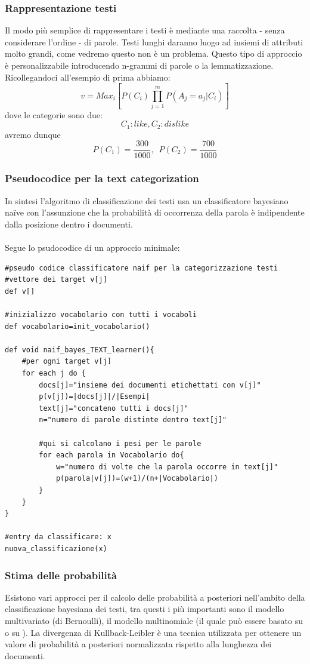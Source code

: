 \documentclass{article}
\theoremstyle{plain}
\theoremstyle{definition}
\begin{document}
\subsubsection{Rappresentazione testi}
Il modo più semplice di rappresentare i testi è mediante una raccolta - senza considerare l'ordine - di parole. Testi lunghi daranno luogo ad insiemi di attributi molto grandi, come vedremo questo non è un problema. Questo tipo di approccio è personalizzabile introducendo n-grammi di parole o la lemmatizzazione.
Ricollegandoci all'esempio di prima abbiamo: 
$$v=Max_i [P(C_i)\prod_{j=1}^m P(A_j=a_j|C_i)]$$
dove le categorie sono due: $$C_1:like, C_2:dislike$$
avremo dunque $$P(C_1)=\frac{300}{1000},\,\,\, P(C_2)=\frac{700}{1000}$$

\subsubsection{Pseudocodice per la text categorization}
In sintesi l'algoritmo di classificazione dei testi usa un classificatore bayesiano naïve con l'assunzione che la probabilità di occorrenza della parola è indipendente dalla posizione dentro i documenti.
\\
\\
Segue lo psudocodice di un approccio minimale:
\begin{lstlisting}
#pseudo codice classificatore naif per la categorizzazione testi
#vettore dei target v[j]
def v[]

#inizializzo vocabolario con tutti i vocaboli
def vocabolario=init_vocabolario()

def void naif_bayes_TEXT_learner(){
	#per ogni target v[j]
	for each j do {
		docs[j]="insieme dei documenti etichettati con v[j]"
		p(v[j])=|docs[j]|/|Esempi|
		text[j]="concateno tutti i docs[j]"
		n="numero di parole distinte dentro text[j]"
		
		#qui si calcolano i pesi per le parole
		for each parola in Vocabolario do{
			w="numero di volte che la parola occorre in text[j]"
			p(parola|v[j])=(w+1)/(n+|Vocabolario|)
		}
	}
}

#entry da classificare: x
nuova_classificazione(x)
\end{lstlisting}

\newpage
\subsubsection{Stima delle probabilità}
Esistono vari approcci per il calcolo delle probabilità a posteriori nell'ambito della classificazione bayesiana dei testi, tra questi i più importanti sono il modello multivariato (di Bernoulli), il modello multinomiale (il quale può essere basato su  o su ). La divergenza di Kullback-Leibler è una tecnica utilizzata per ottenere un valore di probabilità a posteriori normalizzata rispetto alla lunghezza dei documenti.
\end{document}
